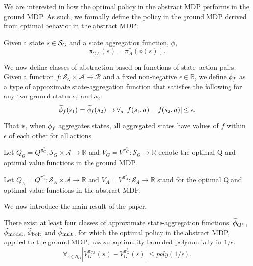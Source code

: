 We are interested in how the optimal policy in the abstract \ac{MDP} performs in the ground \ac{MDP}. As such, we formally define the policy in the ground \ac{MDP} derived from optimal behavior in the abstract \ac{MDP}:

Given a state $s \in \mathcal{S}_G$ and a state aggregation function, $\phi$, 
\begin{equation}
\pi_{GA}(s)=\pi_A^*(\phi(s)).
\end{equation}
\edefn

We now define classes of abstraction based on functions of state--action pairs.
Given a function $f: \mathcal{S}_G \times \mathcal{A} \rightarrow \mathcal{R}$ and a fixed non-negative $\epsilon \in \mathbb{R}$, we define $\widetilde \phi_f$ as a type of approximate state-aggregation function that satisfies the following for any two ground states $s_1$ and $s_2$: 
\begin{equation}
\label{eq:phi_f}
\widetilde \phi_f(s_1) = \widetilde \phi_f(s_2) \rightarrow \forall_a \left|f(s_1, a) - f(s_2, a)\right| \leq \epsilon.
\end{equation}
\edefn

That is, when $\widetilde \phi_f$ aggregates states, all aggregated states have values of $f$ within $\epsilon$ of each other for all actions.

Let $Q_G = Q^{\pi_G^*} : \mathcal{S}_G \times \mathcal{A} \rightarrow \mathbb{R} $ and $V_G = V^{\pi_G^*}: \mathcal{S}_G \rightarrow \mathbb{R} $ denote the optimal Q and optimal value functions in the ground \ac{MDP}.
\edefn

Let $Q_A  = Q^{\pi_A^*}: \mathcal{S}_A \times \mathcal{A} \rightarrow \mathbb{R}$ and $V_A  = V^{\pi_A^*}: \mathcal{S}_A \rightarrow \mathbb{R}$  stand for the optimal Q and optimal value functions in the abstract \ac{MDP}.
\edefn

We now introduce the main result of the paper.

\begin{thm}
There exist at least four classes of approximate state-aggregation functions, $\widetilde \phi_{Q^*}$, $\widetilde \phi_{\text{model}}$, $\widetilde \phi_{\text{bolt}}$ and $\widetilde \phi_{\text{mult}}$, for which the optimal policy in the abstract \ac{MDP}, applied to the ground \ac{MDP}, has suboptimality bounded polynomially in $1/\epsilon$:
\begin{equation}
\forall_{s \in \mathcal{S}_G} | V_G^{\pi_{GA}}(s) - V_G^{\pi_G^*}(s) | \leq poly(1/\epsilon).
\end{equation}
\end{thm}

